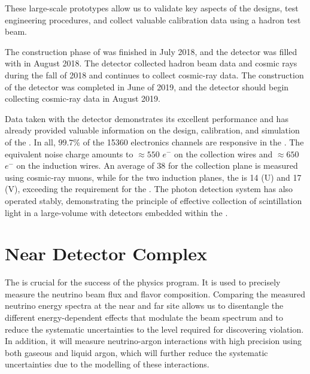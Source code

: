 These large-scale prototypes allow us to validate key aspects of 
the  designs, test engineering procedures, and collect 
valuable calibration data using a hadron test beam. 

The construction phase of  was finished in July 2018, 
and the detector was filled with  in August 2018. The 
detector collected hadron beam data and cosmic rays during the 
fall of 2018 and continues to collect cosmic-ray data.
The construction of the  detector was completed in 
June of 2019, and the detector should begin collecting cosmic-ray 
data in August 2019. 

Data taken with the  detector demonstrates its 
excellent performance and has already provided valuable 
information on the design, calibration, and simulation of the 
 . In all, $99.7\%$ of the 15360  
electronics channels are responsive in the . The 
equivalent noise charge
amounts to $\approx 550$ $e^{-}$ on the collection 
wires and $\approx 650$ $e^{-}$ on the induction wires. An average 
 of 38 for the collection plane is measured using 
cosmic-ray muons, while for the two induction planes, the 
 is 14 (U) and 17 (V), exceeding the requirement  
for the  . 
The  photon detection system has also operated stably, 
demonstrating the principle of effective collection of 
scintillation light in a large-volume  with 
detectors embedded within the .


\section{Near Detector Complex}
\label{sec:physics-nd-overview}

The   is crucial for the success of the  physics program. It is used to precisely measure the neutrino beam flux and flavor composition. Comparing the measured neutrino energy spectra at the near and far site allows us to disentangle the different energy-dependent effects that modulate the beam spectrum and to reduce the systematic uncertainties to the level required for discovering  violation. In addition, it will measure neutrino-argon interactions with high precision using both gaseous and liquid argon, which will further reduce the systematic uncertainties due to the modelling of these interactions.


